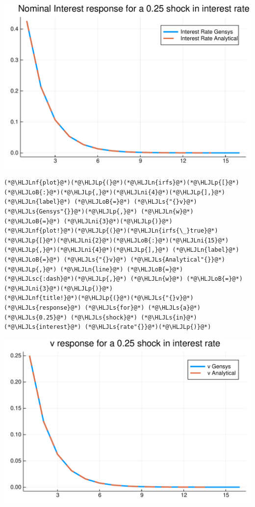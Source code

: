 \documentclass[12pt,a4paper]{article}
\newcommand{\HLJLn}[1]{#1}
\newcommand{\HLJLnf}[1]{\textcolor[RGB]{66,102,213}{#1}}
\newcommand{\HLJLs}[1]{\textcolor[RGB]{201,61,57}{#1}}
\newcommand{\HLJLsc}[1]{\textcolor[RGB]{201,61,57}{#1}}
\newcommand{\HLJLni}[1]{\textcolor[RGB]{59,151,46}{#1}}
\newcommand{\HLJLoB}[1]{\textcolor[RGB]{102,102,102}{\textbf{#1}}}
\newcommand{\HLJLp}[1]{#1}
\begin{document}
\includegraphics[width=\linewidth]{figures/gensys_13_1.pdf}

\begin{lstlisting}
(*@\HLJLnf{plot}@*)(*@\HLJLp{(}@*)(*@\HLJLn{irfs}@*)(*@\HLJLp{[}@*)(*@\HLJLoB{:}@*)(*@\HLJLp{,}@*)(*@\HLJLni{4}@*)(*@\HLJLp{],}@*) (*@\HLJLn{label}@*) (*@\HLJLoB{=}@*) (*@\HLJLs{"{}v}@*) (*@\HLJLs{Gensys"{}}@*)(*@\HLJLp{,}@*) (*@\HLJLn{w}@*) (*@\HLJLoB{=}@*) (*@\HLJLni{3}@*)(*@\HLJLp{)}@*)
(*@\HLJLnf{plot!}@*)(*@\HLJLp{(}@*)(*@\HLJLn{irfs{\_}true}@*)(*@\HLJLp{[}@*)(*@\HLJLni{2}@*)(*@\HLJLoB{:}@*)(*@\HLJLni{15}@*)(*@\HLJLp{,}@*)(*@\HLJLni{4}@*)(*@\HLJLp{],}@*) (*@\HLJLn{label}@*) (*@\HLJLoB{=}@*) (*@\HLJLs{"{}v}@*) (*@\HLJLs{Analytical"{}}@*)(*@\HLJLp{,}@*) (*@\HLJLn{line}@*) (*@\HLJLoB{=}@*) (*@\HLJLsc{:dash}@*)(*@\HLJLp{,}@*) (*@\HLJLn{w}@*) (*@\HLJLoB{=}@*) (*@\HLJLni{3}@*)(*@\HLJLp{)}@*)
(*@\HLJLnf{title!}@*)(*@\HLJLp{(}@*)(*@\HLJLs{"{}v}@*) (*@\HLJLs{response}@*) (*@\HLJLs{for}@*) (*@\HLJLs{a}@*) (*@\HLJLs{0.25}@*) (*@\HLJLs{shock}@*) (*@\HLJLs{in}@*) (*@\HLJLs{interest}@*) (*@\HLJLs{rate"{}}@*)(*@\HLJLp{)}@*)
\end{lstlisting}

\includegraphics[width=\linewidth]{figures/gensys_14_1.pdf}
\end{document}
